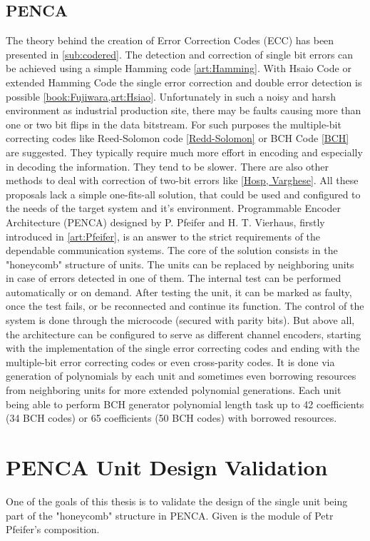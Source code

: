 \subsection{PENCA}
The theory behind the creation of Error Correction Codes (ECC) has been presented in \autoref{sub:codered}. The detection and correction of single bit errors can be achieved using a simple Hamming code \ref{art:Hamming}. With Hsaio Code or extended Hamming Code the single error correction and double error detection is possible \ref{book:Fujiwara,art:Hsiao}. Unfortunately in such a noisy and harsh environment as industrial production site, there may be faults causing more than one or two bit flips in the data bitstream. For such purposes the multiple-bit correcting codes like Reed-Solomon code \ref{Redd-Solomon} or BCH Code \ref{BCH} are suggested. They typically require much more effort in  encoding and especially in decoding the information. They tend to be slower. There are also other methods to deal with correction of two-bit errors like \ref{Hosp, Varghese}. All these proposals lack a simple one-fits-all solution, that could be used and configured to the needs of the target system and it's environment.
Programmable Encoder Architecture (PENCA) designed by P. Pfeifer and H. T. Vierhaus, firstly introduced in \ref{art:Pfeifer}, is an answer to the strict requirements of the dependable communication systems. The core of the solution consists in the "honeycomb" structure of units. The units can be replaced by neighboring units in case of errors detected in one of them. The internal test can be performed automatically or on demand. After testing the unit, it can be marked as faulty, once the test fails, or be reconnected and continue its function. The control of the system is done through the microcode (secured with parity bits). But above all, the architecture can be configured to serve as different channel encoders, starting with the implementation of the single error correcting codes and ending with the multiple-bit error correcting codes or even cross-parity codes. It is done via generation of polynomials by each unit and sometimes even borrowing resources from neighboring units for more extended polynomial generations. Each unit being able to perform BCH generator polynomial length task up to 42 coefficients (34 BCH codes) or 65 coefficients (50 BCH codes) with borrowed resources.

\section{PENCA Unit Design Validation}
One of the goals of this thesis is to validate the design of the single unit being part of the "honeycomb" structure in PENCA. Given is the module of Petr Pfeifer's composition.


